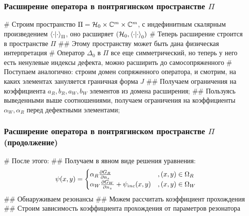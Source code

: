 \documentclass{beamer}
\begin{document}

\begin{frame}[fragile]
\frametitle{Расширение оператора в понтрягинском пространстве $\Pi$}
\begin{easylist}[itemize]
# Строим пространство $\Pi = \mathcal{H}_{0} \times \mathbb{C}^m \times \mathbb{C}^m$, с индефинитным скалярным произведением $\ip{\cdot}{\cdot}_\Pi$, оно расширяет $(\hilb{0}, \ip{\cdot}{\cdot}_0)$
# Теперь расширение строится в пространстве $\Pi$
## Этому пространству может быть дана физическая интерпретация
# Оператор $\Delta_0$ в $\Pi$ все еще симметрический, но теперь у него есть ненулевые индексы дефекта, можно расширить до самосопряженного
# Поступаем аналогично: строим домен сопряженного оператора, и смотрим, на каких элементах зануляется граничная форма $J$
## Получаем ограничения на коэффициента $a_R, b_R, a_W, b_W$ элементов из домена расширения;
## Пользуясь выведенными выше соотношениями, получаем ограничения на коэффициенты $\alpha_W, \alpha_R$ перед дефектными элементами;
\end{easylist}
\end{frame}


\begin{frame}[fragile]
\frametitle{Расширение оператора в понтрягинском пространстве $\Pi$ (продолжение)}
\begin{easylist}[itemize]

# После этого:
## Получаем в явном виде решения уравнения:
\[
\psi(x, y) =
\begin{cases}
\alpha_R \pdv{G_R}{n_s} (x, y, x_s, y_s; k) &, (x, y) \in \Omega_R \\
\alpha_W \pdv{G_W}{n_s} (x, y, x_s, y_s; k) + \psi_{inc}(x, y) &, (x, y) \in \Omega_W  
\end{cases}
\]
## Обнаруживаем резонансы
## Можем рассчитать коэффициент прохождения
## Строим зависимость коэффициента прохождения от параметров резонатора
\end{easylist}
\end{frame}
\end{document}
